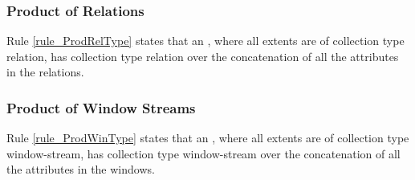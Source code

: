 \subsubsection{Product of Relations}

Rule \ref{rule_ProdRelType} states that an , where all
extents are of collection type relation, has collection type relation
over the concatenation of all the attributes in the relations.


\subsubsection{Product of Window Streams}

Rule \ref{rule_ProdWinType} states that an , where all
extents are of collection type window-stream, has collection type
window-stream over the concatenation of all the attributes in the
windows.


